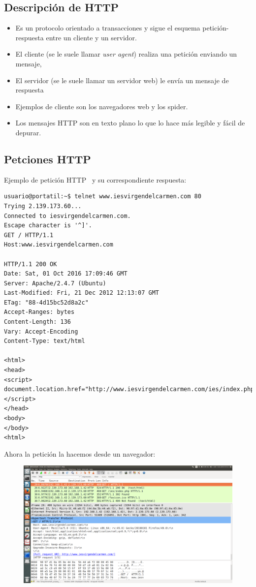 \documentclass[4paper]{article}
\newcommand{\HT}{HTTP}
\begin{document}
\subsection{Descripción de \HT}
\begin{itemize}
\item Es un protocolo orientado a transacciones y sigue el esquema petición-respuesta entre un cliente y un servidor.
\item   El cliente (se le suele llamar \emph{user agent}) realiza una petición enviando un mensaje,
\item El servidor (se le suele llamar un servidor web) le envía un mensaje de respuesta
\item Ejemplos de cliente son los navegadores web y los spider.
\item Los mensajes HTTP son en texto plano lo que lo hace más legible y fácil de depurar.
\end{itemize}

\subsection{Petciones \HT}
Ejemplo de petición \HT ~ y su correspondiente respuesta:
\begin{verbatim}
usuario@portatil:~$ telnet www.iesvirgendelcarmen.com 80
Trying 2.139.173.60...
Connected to iesvirgendelcarmen.com.
Escape character is '^]'.
GET / HTTP/1.1
Host:www.iesvirgendelcarmen.com

HTTP/1.1 200 OK
Date: Sat, 01 Oct 2016 17:09:46 GMT
Server: Apache/2.4.7 (Ubuntu)
Last-Modified: Fri, 21 Dec 2012 12:13:07 GMT
ETag: "88-4d15bc52d8a2c"
Accept-Ranges: bytes
Content-Length: 136
Vary: Accept-Encoding
Content-Type: text/html

<html>
<head>
<script>
document.location.href="http://www.iesvirgendelcarmen.com/ies/index.php"
</script>
</head>
<body>
</body>
<html>

\end{verbatim}
Ahora la petición la hacemos desde un navegador:
\begin{figure}[H]
\includegraphics[scale=0.22]{../imagenes/wireshark.png}
\end{figure}
\end{document}
